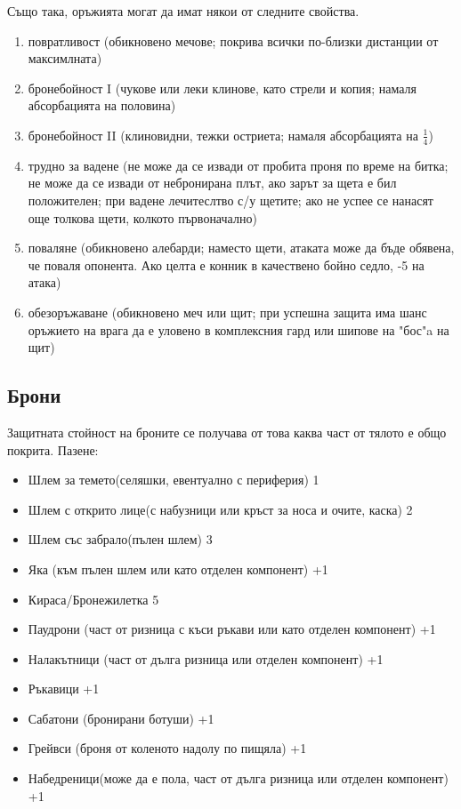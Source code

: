 Също така, оръжията могат да имат някои от следните свойства.
\begin{enumerate}
\item{повратливост (обикновено мечове; покрива всички по-близки дистанции от максимлната)}
\item{бронебойност I (чукове или леки клинове, като стрели и копия; намаля абсорбацията на половина)}
\item{бронебойност II (клиновидни, тежки остриета; намаля абсорбацията на $\frac1 4$)}
\item{трудно за вадене (не може да се извади от пробита проня по време на битка; не може да се извади от небронирана плът, ако зарът за щета е бил положителен; при вадене лечитеслтво с/у щетите; ако не успее се  нанасят още толкова щети, колкото първоначално)}
\item{поваляне (обикновено алебарди; наместо щети, атаката може да бъде обявена, че поваля опонента. Ако целта е конник в качествено бойно седло, -5 на атака)}
\item{обезоръжаване (обикновено меч или щит; при успешна защита има шанс оръжието на врага да е уловено в комплексния гард или шипове на "бос"a на щит)}
\end{enumerate}

\subsection{Брони}
Защитната стойност на броните се получава от това каква част от тялото е общо покрита.
Пазене:
\begin{itemize}
\item{Шлем за темето(селяшки, евентуално с периферия) 1}
\item{Шлем с открито лице(с набузници или кръст за носа и очите, каска) 2}
\item{Шлем със забрало(пълен шлем) 3}
\item{Яка (към пълен шлем или като отделен компонент) +1}

\item{Кираса/Бронежилетка 5}

\item{Паудрони (част от ризница с къси ръкави или като отделен компонент) +1}
\item{Налакътници (част от дълга ризница или отделен компонент) +1}
\item{Ръкавици +1}

\item{Сабатони (бронирани ботуши) +1}
\item{Грейвси (броня от коленото надолу по пищяла) +1}
\item{Набедреници(може да е пола, част от дълга ризница или отделен компонент) +1}
\end{itemize}

